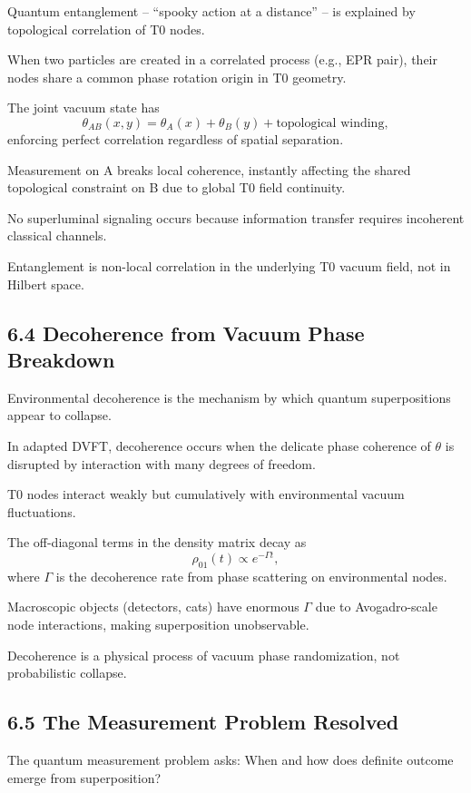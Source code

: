 	Quantum entanglement – ``spooky action at a distance'' – is explained by topological correlation of T0 nodes.
	
	When two particles are created in a correlated process (e.g., EPR pair), their nodes share a common phase rotation origin in T0 geometry.
	
	The joint vacuum state has
	\[
	\theta_{AB}(x,y) = \theta_A(x) + \theta_B(y) + \text{topological winding},
	\]
	enforcing perfect correlation regardless of spatial separation.
	
	Measurement on A breaks local coherence, instantly affecting the shared topological constraint on B due to global T0 field continuity.
	
	No superluminal signaling occurs because information transfer requires incoherent classical channels.
	
	Entanglement is non-local correlation in the underlying T0 vacuum field, not in Hilbert space.
	
	\subsection{6.4 Decoherence from Vacuum Phase Breakdown}
	
	Environmental decoherence is the mechanism by which quantum superpositions appear to collapse.
	
	In adapted DVFT, decoherence occurs when the delicate phase coherence of $\theta$ is disrupted by interaction with many degrees of freedom.
	
	T0 nodes interact weakly but cumulatively with environmental vacuum fluctuations.
	
	The off-diagonal terms in the density matrix decay as
	\[
	\rho_{01}(t) \propto e^{-\Gamma t},
	\]
	where $\Gamma$ is the decoherence rate from phase scattering on environmental nodes.
	
	Macroscopic objects (detectors, cats) have enormous $\Gamma$ due to Avogadro-scale node interactions, making superposition unobservable.
	
	Decoherence is a physical process of vacuum phase randomization, not probabilistic collapse.
	
	\subsection{6.5 The Measurement Problem Resolved}
	
	The quantum measurement problem asks: When and how does definite outcome emerge from superposition?
	
